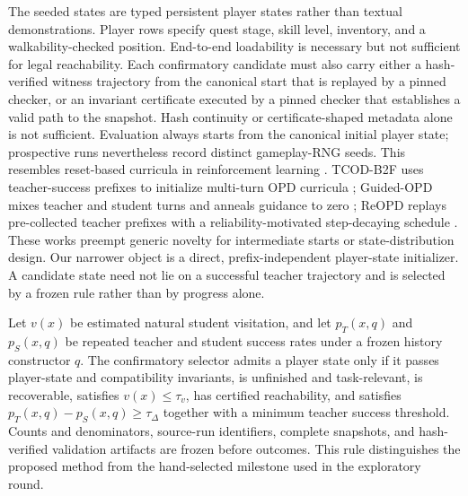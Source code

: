 \documentclass[11pt,a4paper]{article}
\begin{document}
The seeded states are typed persistent player states rather than textual demonstrations.
Player rows specify quest stage, skill level, inventory, and a walkability-checked
position. End-to-end loadability is necessary but not sufficient for legal
reachability. Each confirmatory candidate must also carry either a hash-verified
witness trajectory from the canonical start that is replayed by a pinned checker,
or an invariant certificate executed by a pinned checker that establishes a valid
path to the snapshot. Hash continuity or certificate-shaped metadata alone is not
sufficient. Evaluation always starts from the canonical initial player state;
prospective runs nevertheless record distinct gameplay-RNG seeds. This resembles reset-based curricula in reinforcement learning
\citep{salimans2018montezuma,resnick2018backplay,ecoffet2021goexplore}. TCOD-B2F
uses teacher-success prefixes to initialize multi-turn OPD curricula
\citep{wang2026tcod}; Guided-OPD mixes teacher and student turns and anneals
guidance to zero \citep{li2026guidedopd}; ReOPD replays pre-collected teacher
prefixes with a reliability-motivated step-decaying schedule
\citep{liao2026reopd}. These works preempt generic
novelty for intermediate starts or state-distribution design. Our narrower
object is a direct, prefix-independent player-state initializer. A candidate
state need not lie on a successful teacher trajectory and is selected by a
frozen rule rather than by progress alone.

Let $v(x)$ be estimated natural student visitation, and let $p_T(x,q)$ and
$p_S(x,q)$ be repeated teacher and student success rates under a frozen history
constructor $q$. The confirmatory selector admits a player state only if it
passes player-state and compatibility invariants, is unfinished and task-relevant, is recoverable,
satisfies $v(x)\leq\tau_v$, has certified reachability, and satisfies
$p_T(x,q)-p_S(x,q)\geq\tau_\Delta$ together with a minimum teacher
success threshold. Counts and denominators, source-run identifiers, complete
snapshots, and hash-verified validation artifacts are frozen before outcomes.
This rule distinguishes the proposed method from the hand-selected milestone
used in the exploratory round.
\end{document}
